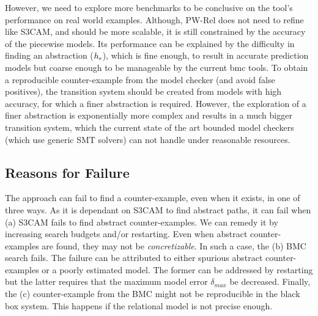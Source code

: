 However, we need to explore more benchmarks to be conclusive on the
tool's performance on real world examples. Although, PW-Rel does not
need to refine like S3CAM, and should be more scalable, it is still
constrained by the accuracy of the piecewise models. Its performance can be
explained by the difficulty in finding an abstraction
($h_\epsilon$), which is fine enough, to result in accurate
prediction models but coarse enough to be manageable by the current
bmc tools.  To obtain a reproducible counter-example from the model
checker (and avoid false positives), the transition system should be
created from models with high accuracy, for which a finer abstraction
is required.  However, the exploration of a finer abstraction is
exponentially more complex and results in a much bigger transition
system, which the current state of the art bounded model checkers
(which use generic SMT solvers) can not handle under reasonable
resources.

\subsection{Reasons for Failure}

The approach can fail to find a counter-example, even when it exists,
in one of three ways. As it is dependant on S3CAM to find abstract
paths, it can fail when (a) S3CAM fails to find abstract
counter-examples. We can remedy it by increasing search budgets and/or
restarting. Even when abstract counter-examples are found, they may
not be \emph{concretizable}. In such a case, the (b) BMC search fails.
The failure can be attributed to either spurious abstract
counter-examples or a poorly estimated model. The former can be
addressed by restarting but the latter requires that the maximum model
error $\delta_{max}$ be decreased. Finally, the (c) counter-example
from the BMC might not be reproducible in the black box system. This
happens if the relational model is not precise enough.
